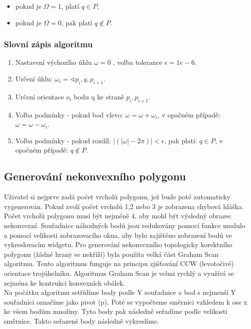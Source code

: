 \documentclass[a4paper,11pt,twoside]{article}
\begin{document}
\begin{itemize}
\item pokud je $\Omega = 1$, platí $q \in P$, 
\item pokud je $\Omega = 0$, pak platí $q { \not \in } P$.
\end{itemize}

\newpage
\vspace*{-1cm}
\subsubsection{Slovní zápis algoritmu}
\begin{enumerate}
\item Nastavení výchozího úhlu $\omega = 0$ , volba tolerance $\epsilon = 1e-6$.
\item Určení úhlu: $\omega_i = \sphericalangle p_i, q, p_{i+1}$.
\item Určení orientace $o_i$ bodu q ke straně $p_i, p_{i+1}$.
\item Volba podmínky - pokud bod vlevo: $\omega = \omega + \omega_i$, v opačném případě: $\omega = \omega - \omega_i$.
\item Volba podmínky - pokud rozdíl: $|(|\omega| - 2\pi)| < \epsilon$, pak platí: $q \in P$, v opačném případě:  $ q { \not \in } P $.
\end{enumerate}

\subsection{Generování nekonvexního polygonu}
Uživatel si nejprve zadá počet vrcholů polygonu, jež bude poté automaticky vygenerován. Pokud zvolí počet vrcholů 1,2 nebo 3 je zobrazena chybová hláška. Počet vrcholů polygonu musí být nejméně 4, aby mohl být výsledný obrazec nekonvexní. 
Souřadnice náhodných bodů jsou redukovány pomocí funkce modulo a pomocí velikosti zobrazovacího okna, aby bylo zajištěno zobrazení bodů ve vykreslovacím widgetu. Pro generování nekonvexního topologicky korektního polygonu (žádné hrany se nekříží) byla použita velká část Graham Scan algoritmu. Tento algoritmus funguje na principu zjišťování CCW (levotočivé) orientace trojúhelníku. Algoritmus Graham Scan je velmi rychlý a využívá se zejména ke kontrukci konvexních obálek. \\
\indent Na počátku algoritmu setřídíme body podle Y souřadnice a bod s nejmenší Y souřadnicí označíme jako pivot (p). Poté se vypočteme směrnici vzhledem k ose x ke všem bodům množiny. Tyto body pak následně seřadíme podle velikosti směrnice. Takto seřazené body následně vykreslíme.
\end{document}
